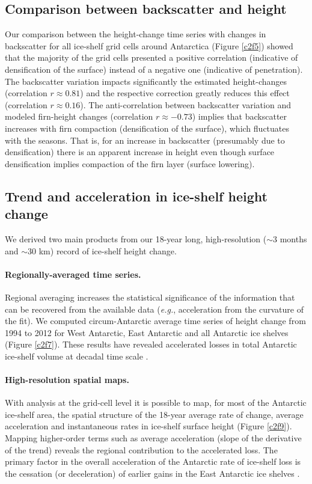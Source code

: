 \subsection{Comparison between backscatter and height}

Our comparison between the height-change time series with changes in backscatter for all ice-shelf grid cells around Antarctica (Figure \ref{c2f5}) showed that the majority of the grid cells presented a positive correlation (indicative of densification of the surface) instead of a negative one (indicative of penetration). The backscatter variation impacts significantly the estimated height-changes (correlation $r \approx 0.81$) and the respective correction greatly reduces this effect (correlation $r \approx 0.16$). The anti-correlation between backscatter variation and modeled firn-height changes (correlation $r \approx -0.73$) implies that backscatter increases with firn compaction (densification of the surface), which fluctuates with the seasons. That is, for an increase in backscatter (presumably due to densification) there is an apparent increase in height even though surface densification implies compaction of the firn layer (surface lowering).

\subsection{Trend and acceleration in ice-shelf height change}

We derived two main products from our 18-year long, high-resolution ($\sim$3 months and $\sim$30 km) record of ice-shelf height change.

\paragraph{Regionally-averaged time series.} Regional averaging increases the statistical significance of the information that can be recovered from the available data ({\it e.g.}, acceleration from the curvature of the fit). We computed circum-Antarctic average time series of height change from 1994 to 2012 for West Antarctic, East Antarctic and all Antarctic ice shelves (Figure \ref{c2f7}). These results have revealed accelerated losses in total Antarctic ice-shelf volume at decadal time scale \parencite{Paolo2015}.

\paragraph{High-resolution spatial maps.} With analysis at the grid-cell level it is possible to map, for most of the Antarctic ice-shelf area, the spatial structure of the 18-year average rate of change, average acceleration and instantaneous rates in ice-shelf surface height (Figure \ref{c2f9}). Mapping higher-order terms such as average acceleration (slope of the derivative of the trend) reveals the regional contribution to the accelerated loss. The primary factor in the overall acceleration of the Antarctic rate of ice-shelf loss is the cessation (or deceleration) of earlier gains in the East Antarctic ice shelves \parencite{Paolo2015}.


